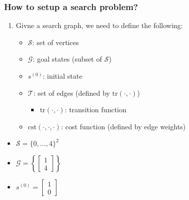 \subsubsection{How to setup a search problem?}
\begin{process} 
    \begin{enumerate}
        \item Givne a search graph, we need to define the following:
        \begin{itemize}
            \item $\mathcal{S}$: set of vertices
            \item $\mathcal{G}$: goal states (subset of $\mathcal{S}$)
            \item $s^{(0)}$: initial state
            \item $\mathcal{T}$: set of edges (defined by $\text{tr}(\cdot, \cdot)$)
            \begin{itemize}
                \item $\text{tr}(\cdot, \cdot)$: transition function
            \end{itemize}
            \item $\text{cst}(\cdot, \cdot, \cdot)$: cost function (defined by edge weights)
        \end{itemize}
    \end{enumerate}
\end{process}

\begin{example}
\end{example}
\newpage

\begin{example}
    \begin{itemize}
        \item $\mathcal{S} = \{0,\ldots,4 \}^2$
        \item $\mathcal{G} = \left\{ \begin{bmatrix}
            1 \\
            4
        \end{bmatrix} \right\}$
        \item $s^{(0)} = \begin{bmatrix}
            1 \\
            0
        \end{bmatrix}$
    \end{itemize}
\end{example}
\newpage

